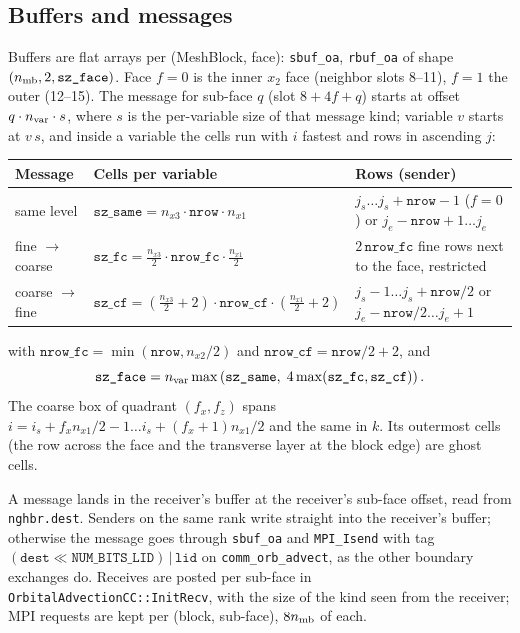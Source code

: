 \documentclass[11pt]{article}
\newcommand{\code}[1]{\texttt{#1}}
\newcommand{\fn}[1]{\texttt{\small #1}}
\begin{document}
\subsection{Buffers and messages}
Buffers are flat arrays per (MeshBlock, face): \code{sbuf\_oa}, \code{rbuf\_oa} of shape
$(n_{\rm mb}, 2, \code{sz\_face})$. Face $f = 0$ is the inner $x_2$ face (neighbor slots
8--11), $f = 1$ the outer (12--15). The message for sub-face $q$ (slot $8 + 4f + q$) starts
at offset $q \cdot n_{\rm var} \cdot s$, where $s$ is the per-variable size of that
message kind; variable $v$ starts at $v\,s$, and inside a variable the cells run with $i$
fastest and rows in ascending $j$:

\begin{center}
\small
\begin{tabular}{@{}lll@{}}
\toprule
Message & Cells per variable & Rows (sender) \\
\midrule
same level & $\code{sz\_same} = n_{x3}\cdot\code{nrow}\cdot n_{x1}$ &
  $j_s \ldots j_s{+}\code{nrow}{-}1$ ($f{=}0$) or $j_e{-}\code{nrow}{+}1 \ldots j_e$ \\
fine $\to$ coarse & $\code{sz\_fc} = \tfrac{n_{x3}}2\cdot\code{nrow\_fc}\cdot\tfrac{n_{x1}}2$
  & $2\,\code{nrow\_fc}$ fine rows next to the face, restricted \\
coarse $\to$ fine & $\code{sz\_cf} = (\tfrac{n_{x3}}2{+}2)\cdot\code{nrow\_cf}\cdot
  (\tfrac{n_{x1}}2{+}2)$ & $j_s{-}1 \ldots j_s{+}\code{nrow}/2$ or
  $j_e{-}\code{nrow}/2 \ldots j_e{+}1$ \\
\bottomrule
\end{tabular}
\end{center}

\noindent
with $\code{nrow\_fc} = \min(\code{nrow}, n_{x2}/2)$ and
$\code{nrow\_cf} = \code{nrow}/2 + 2$, and
\[
  \code{sz\_face} = n_{\rm var}\max\left(\code{sz\_same},\;
  4\max(\code{sz\_fc},\code{sz\_cf})\right).
\]
The coarse box of quadrant $(f_x, f_z)$ spans
$i = i_s + f_x n_{x1}/2 - 1 \ldots i_s + (f_x{+}1) n_{x1}/2$ and the same in $k$. Its
outermost cells (the row across the face and the transverse layer at the block edge) are
ghost cells.

A message lands in the receiver's buffer at the receiver's sub-face offset, read from
\code{nghbr.dest}. Senders on the same rank write straight into the receiver's buffer;
otherwise the message goes through \code{sbuf\_oa} and \code{MPI\_Isend} with tag
$(\code{dest} \ll \code{NUM\_BITS\_LID}) \,|\, \code{lid}$ on \code{comm\_orb\_advect}, as
the other boundary exchanges do. Receives are posted per sub-face in
\fn{OrbitalAdvectionCC::InitRecv}, with the size of the kind seen from the receiver; MPI
requests are kept per (block, sub-face), $8 n_{\rm mb}$ of each.
\end{document}
